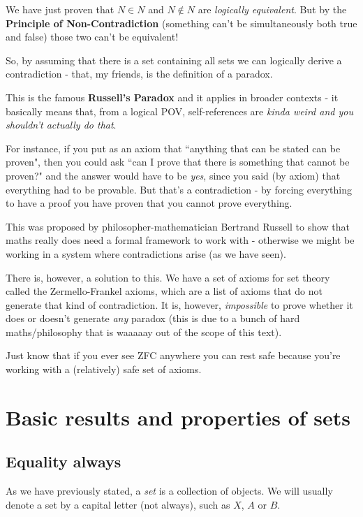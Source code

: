 We have just proven that $N\in N$ and $N\notin N$ are \textit{logically equivalent}. But by the \textbf{Principle of Non-Contradiction} (something can't be simultaneously both true and false) those two can't be equivalent!

So, by assuming that there is a set containing all sets we can logically derive a contradiction - that, my friends, is the definition of a paradox.

This is the famous \textbf{Russell's Paradox} and it applies in broader contexts - it basically means that, from a logical POV, self-references are \textit{kinda weird and you shouldn't actually do that}.

For instance, if you put as an axiom that ``anything that can be stated can be proven", then you could ask ``can I prove that there is something that cannot be proven?" and the answer would have to be \textit{yes}, since you said (by axiom) that everything had to be provable. But that's a contradiction - by forcing everything to have a proof you have proven that you cannot prove everything.

This was proposed by philosopher-mathematician Bertrand Russell to show that maths really does need a formal framework to work with - otherwise we might be working in a system where contradictions arise (as we have seen).

There is, however, a solution to this. We have a set of axioms for set theory called the Zermello-Frankel axioms, which are a list of axioms that do not generate that kind of contradiction. It is, however, \textit{impossible} to prove whether it does or doesn't generate \textit{any} paradox (this is due to a bunch of hard maths/philosophy that is waaaaay out of the scope of this text).

Just know that if you ever see ZFC anywhere you can rest safe because you're working with a (relatively) safe set of axioms.
\pagebreak
\section{Basic results and properties of sets}
\subsection{Equality always}

As we have previously stated, a \textit{set} is a collection of objects. We will usually denote a set by a capital letter (not always), such as $X$, $A$ or $B$.


